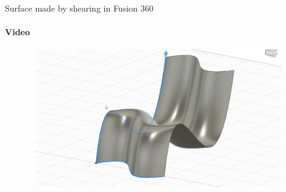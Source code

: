 \documentclass[aspectratio=169]{beamer}
\begin{document}
\begin{frame}[t]{Surface made by shearing in Fusion 360}
    \framesubtitle{Video}
    \vspace{-0.6cm}
    \begin{figure}[H]
        \href{https://disk.yandex.ru/i/bKQBOf8JJm4DaA}{
            \centering\includegraphics[height=6cm,width=1\textwidth,keepaspectratio]{shear_surface_video_preview.jpg}}
    \end{figure}
\end{frame}
\end{document}
